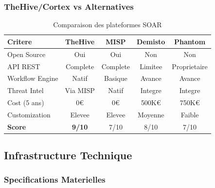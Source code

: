 \subsubsection{TheHive/Cortex vs Alternatives}

\begin{table}[H]
    \centering
    \caption{Comparaison des plateformes SOAR}
    \begin{tabular}{|l|c|c|c|c|}
        \hline
        \textbf{Critere} & \textbf{TheHive} & \textbf{MISP} & \textbf{Demisto} & \textbf{Phantom} \\
        \hline
        Open Source      & Oui              & Oui           & Non              & Non              \\
        \hline
        API REST         & Complete         & Complete      & Limitee          & Proprietaire     \\
        \hline
        Workflow Engine  & Natif            & Basique       & Avance           & Avance           \\
        \hline
        Threat Intel     & Via MISP         & Natif         & Integre          & Integre          \\
        \hline
        Cost (5 ans)     & 0€               & 0€            & 500K€            & 750K€            \\
        \hline
        Customization    & Elevee           & Elevee        & Moyenne          & Faible           \\
        \hline
        \textbf{Score}   & \textbf{9/10}    & 7/10          & 8/10             & 7/10             \\
        \hline
    \end{tabular}
\end{table}

\subsection{Infrastructure Technique}

\subsubsection{Specifications Materielles}

